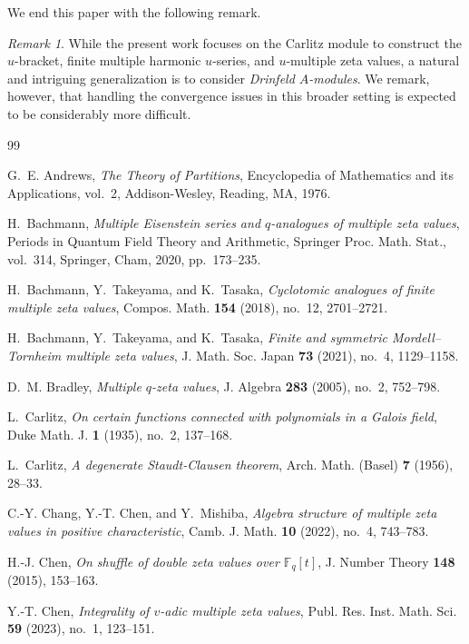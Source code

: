 \documentclass[12pt,reqno]{amsart}
\numberwithin{equation}{section}
\theoremstyle{plain}
\theoremstyle{definition}
\theoremstyle{remark}
\newtheorem{rmk}[thm]{Remark}
\begin{document}
We end this paper with the following remark.
\begin{rmk}
    While the present work focuses on the Carlitz module to construct the $u$-bracket, finite multiple harmonic $u$-series, and $u$-multiple zeta values, a natural and intriguing generalization is to consider \textit{Drinfeld $A$-modules}. We remark, however, that handling the convergence issues in this broader setting is expected to be considerably more difficult.
\end{rmk}
\sloppy
\begin{thebibliography}{99}

G.~E. Andrews, \emph{The Theory of Partitions}, Encyclopedia of Mathematics and its Applications, vol.~2, Addison-Wesley, Reading, MA, 1976.

H.~Bachmann, \emph{Multiple Eisenstein series and $q$-analogues of multiple zeta values}, Periods in Quantum Field Theory and Arithmetic, Springer Proc. Math. Stat., vol.~314, Springer, Cham, 2020, pp.~173--235.

H.~Bachmann, Y.~Takeyama, and K.~Tasaka, \emph{Cyclotomic analogues of finite multiple zeta values}, Compos. Math. \textbf{154} (2018), no.~12, 2701--2721.

H.~Bachmann, Y.~Takeyama, and K.~Tasaka, \emph{Finite and symmetric Mordell–Tornheim multiple zeta values}, J. Math. Soc. Japan \textbf{73} (2021), no.~4, 1129--1158.

D.~M. Bradley, \emph{Multiple {$q$}-zeta values}, J. Algebra \textbf{283} (2005), no.~2, 752--798.

L.~Carlitz, \emph{On certain functions connected with polynomials in a Galois field}, Duke Math. J. \textbf{1} (1935), no.~2, 137--168.

L.~Carlitz, \emph{A degenerate Staudt-Clausen theorem}, Arch. Math. (Basel) \textbf{7} (1956), 28--33.

C.-Y. Chang, Y.-T. Chen, and Y.~Mishiba, \emph{Algebra structure of multiple zeta values in positive characteristic}, Camb. J. Math. \textbf{10} (2022), no.~4, 743--783.

H.-J. Chen, \emph{On shuffle of double zeta values over {$\mathbb{F}_q[t]$}}, J. Number Theory \textbf{148} (2015), 153--163.

Y.-T. Chen, \emph{Integrality of $v$-adic multiple zeta values}, Publ. Res. Inst. Math. Sci. \textbf{59} (2023), no.~1, 123--151.


\end{thebibliography}
\end{document}
